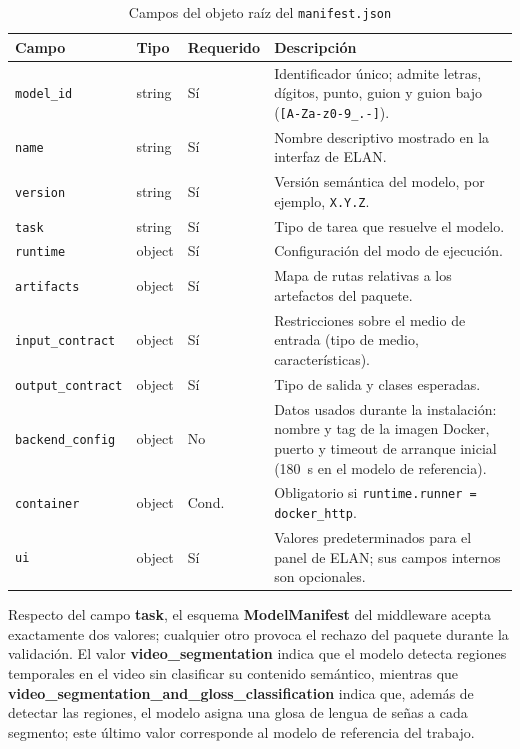 \begin{table}[H]
\centering
\caption{Campos del objeto raíz del \texttt{manifest.json}}
\label{tab:manifest_root}
\scriptsize
\renewcommand{\arraystretch}{1.08}
\setlength{\tabcolsep}{3.5pt}

\begin{tabular}{
    >{\raggedright\arraybackslash}p{3.0cm}
    >{\raggedright\arraybackslash}p{1.6cm}
    >{\centering\arraybackslash}p{1.8cm}
    >{\raggedright\arraybackslash}p{6.3cm}
}
\toprule
\textbf{Campo} & \textbf{Tipo} & \textbf{Requerido} & \textbf{Descripción} \\
\midrule
\texttt{model\_id} & string & Sí & Identificador único; admite letras, dígitos, punto, guion y guion bajo (\texttt{[A-Za-z0-9\_.-]}). \\
\texttt{name} & string & Sí & Nombre descriptivo mostrado en la interfaz de ELAN. \\
\texttt{version} & string & Sí & Versión semántica del modelo, por ejemplo, \texttt{X.Y.Z}. \\
\texttt{task} & string & Sí & Tipo de tarea que resuelve el modelo. \\
\texttt{runtime} & object & Sí & Configuración del modo de ejecución. \\
\texttt{artifacts} & object & Sí & Mapa de rutas relativas a los artefactos del paquete. \\
\texttt{input\_contract} & object & Sí & Restricciones sobre el medio de entrada (tipo de medio, características). \\
\texttt{output\_contract} & object & Sí & Tipo de salida y clases esperadas. \\
\texttt{backend\_config} & object & No & Datos usados durante la instalación: nombre y tag de la imagen Docker, puerto y timeout de arranque inicial (180~s en el modelo de referencia). \\
\texttt{container} & object & Cond. & Obligatorio si \texttt{runtime.runner = docker\_http}. \\
\texttt{ui} & object & Sí & Valores predeterminados para el panel de ELAN; sus campos internos son opcionales. \\
\bottomrule
\end{tabular}
\end{table}

Respecto del campo \textbf{task}, el esquema \textbf{ModelManifest} del middleware acepta exactamente dos valores; cualquier otro provoca el rechazo del paquete durante la validación. El valor \textbf{video\_segmentation} indica que el modelo detecta regiones temporales en el video sin clasificar su contenido semántico, mientras que \textbf{video\_segmentation\_and\_gloss\_classification} indica que, además de detectar las regiones, el modelo asigna una glosa de lengua de señas a cada segmento; este último valor corresponde al modelo de referencia del trabajo.

